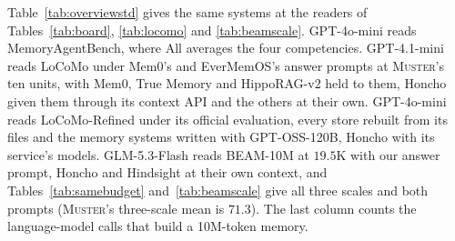 \documentclass{article}
\newcommand{\sys}{\textsc{Muster}}
\begin{document}
Table~\ref{tab:overviewstd} gives the same systems at the readers of Tables~\ref{tab:board}, \ref{tab:locomo} and \ref{tab:beamscale}. GPT-4o-mini reads MemoryAgentBench, where All averages the four competencies. GPT-4.1-mini reads LoCoMo under Mem0's and EverMemOS's answer prompts at \sys{}'s ten units, with Mem0, True Memory and HippoRAG-v2 held to them, Honcho given them through its context API and the others at their own. GPT-4o-mini reads LoCoMo-Refined under its official evaluation, every store rebuilt from its files and the memory systems written with GPT-OSS-120B, Honcho with its service's models. GLM-5.3-Flash reads BEAM-10M at $19.5$K with our answer prompt, Honcho and Hindsight at their own context, and Tables~\ref{tab:samebudget} and~\ref{tab:beamscale} give all three scales and both prompts (\sys{}'s three-scale mean is $71.3$). The last column counts the language-model calls that build a 10M-token memory.
\end{document}
